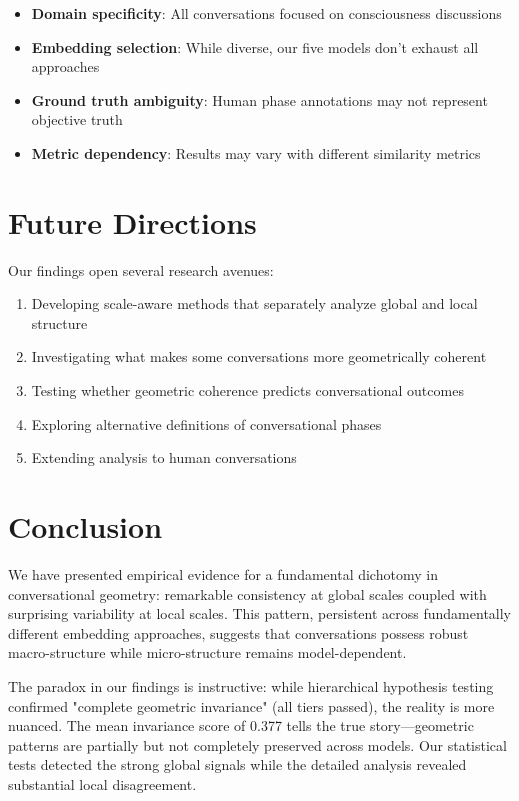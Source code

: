 \documentclass[11pt,letterpaper]{article}
\newcommand{\meanInvarianceScore}{0.377}
\begin{document}
\begin{itemize}
\item \textbf{Domain specificity}: All conversations focused on consciousness discussions
\item \textbf{Embedding selection}: While diverse, our five models don't exhaust all approaches
\item \textbf{Ground truth ambiguity}: Human phase annotations may not represent objective truth
\item \textbf{Metric dependency}: Results may vary with different similarity metrics
\end{itemize}

\section{Future Directions}

Our findings open several research avenues:

\begin{enumerate}
\item Developing scale-aware methods that separately analyze global and local structure
\item Investigating what makes some conversations more geometrically coherent
\item Testing whether geometric coherence predicts conversational outcomes
\item Exploring alternative definitions of conversational phases
\item Extending analysis to human conversations
\end{enumerate}

\section{Conclusion}

We have presented empirical evidence for a fundamental dichotomy in conversational geometry: remarkable consistency at global scales coupled with surprising variability at local scales. This pattern, persistent across fundamentally different embedding approaches, suggests that conversations possess robust macro-structure while micro-structure remains model-dependent.

The paradox in our findings is instructive: while hierarchical hypothesis testing confirmed "complete geometric invariance" (all tiers passed), the reality is more nuanced. The mean invariance score of \meanInvarianceScore{} tells the true story—geometric patterns are partially but not completely preserved across models. Our statistical tests detected the strong global signals while the detailed analysis revealed substantial local disagreement.
\end{document}
